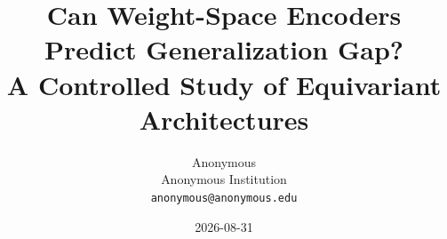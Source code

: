 \documentclass[10pt]{article}
\title{Can Weight-Space Encoders Predict Generalization Gap?\\
A Controlled Study of Equivariant Architectures}
\author{Anonymous\\
Anonymous Institution\\
\texttt{anonymous@anonymous.edu}}
\date{2026-08-31}
\begin{document}
\maketitle


\begin{abstract}

\end{abstract}















\newpage
\appendix

\end{document}
